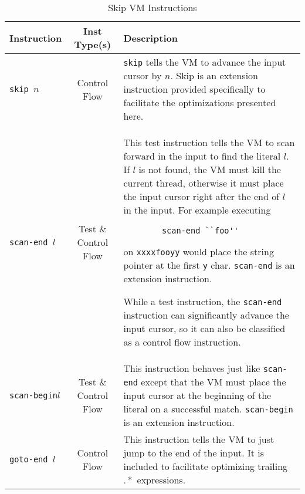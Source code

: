 \begin{table}[ht]
\centering

\begin{tabular}{ | l | c | p{8cm} | } \hline
Instruction & Inst Type(s) & Description \\ \hline
{\tt skip $n$} & Control Flow &
    \verb'skip' tells the VM to advance the input cursor by $n$.
    Skip is an extension
    instruction provided specifically to facilitate the optimizations
    presented here. \\ \hline
{\tt scan-end $l$} & Test \& Control Flow &
    This test instruction tells the VM to scan forward in the input to find
    the literal $l$. If $l$ is not found, the VM must kill the current thread,
    otherwise it must place the input cursor
    right after the end of $l$ in the input. For example executing
        \begin{verbatim}
        scan-end ``foo''
        \end{verbatim}
    on \verb'xxxxfooyy' would place the string pointer at the first \verb'y'
    char. \verb'scan-end' is an extension instruction.

    While a test instruction, the \verb'scan-end' instruction can
    significantly advance the input cursor, so it can also be classified
    as a control flow instruction. \\ \hline
{\tt scan-begin$l$} & Test \& Control Flow &
    This instruction behaves just like \verb'scan-end' except that the
    VM must place the input cursor at the beginning of the literal on
    a successful match. \verb'scan-begin' is an extension instruction.
    \\ \hline
{\tt goto-end $l$} & Control Flow &
    This instruction tells the VM to just jump to the end of the input.
    It is included to facilitate optimizing trailing $.*$ expressions.
    \\ \hline
\end{tabular}

\caption{Skip VM Instructions}
\label{table:skipinsts}
\end{table}
